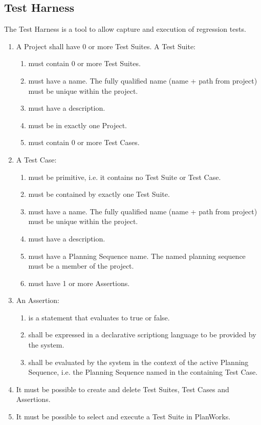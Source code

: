 \documentclass[twoside, 11pt]{article}
\begin{document}
\subsection{Test Harness}
The Test Harness is a tool to allow capture and execution of regression tests.
\begin{enumerate}
\item A Project shall have 0 or more Test Suites. A Test Suite:
\begin{enumerate}
\item must contain 0 or more Test Suites.
\item must have a name. The fully qualified name (name + path from project) must be unique within the project.
\item must have a description.
\item must be in exactly one Project.
\item must contain 0 or more Test Cases.
\end{enumerate}
\item A Test Case:
\begin{enumerate}
\item must be primitive, i.e. it contains no Test Suite or Test Case.
\item must be contained by exactly one Test Suite.
\item must have a name. The fully qualified name (name + path from project) must be unique within the project.
\item must have a description.
\item must have a Planning Sequence name. The named planning sequence must be a member of the project.
\item must have 1 or more Assertions.
\end{enumerate}
\item An Assertion:
\begin{enumerate}
\item is a statement that evaluates to true or false.
\item shall be expressed in a declarative scriptiong language to be provided by the system.
\item shall be evaluated by the system in the context of the active Planning Sequence, i.e. the Planning Sequence named in the containing Test Case. 
\end{enumerate}
\item It must be possible to create and delete Test Suites, Test Cases and Assertions.
\item It must be possible to select and execute a Test Suite in PlanWorks.

\end{enumerate}
\end{document}
